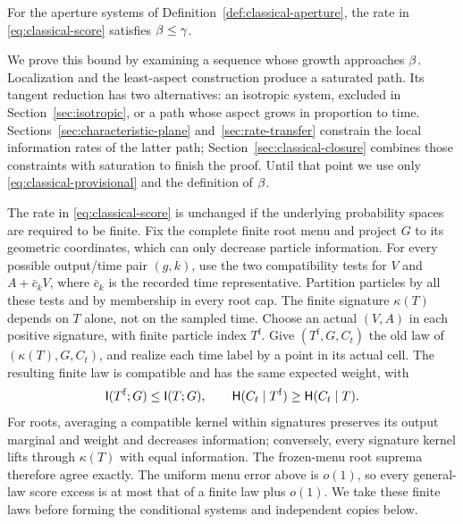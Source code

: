 \begin{theorem}
\label{thm:classical-growth}
For the aperture systems of Definition~\ref{def:classical-aperture},
the rate in \eqref{eq:classical-score} satisfies $\beta\le\gamma$.
\end{theorem}

We prove this bound by examining a sequence whose growth approaches
$\beta$. Localization and the least-aspect construction produce a
saturated path. Its tangent reduction has two alternatives: an isotropic
system, excluded in Section~\ref{sec:isotropic}, or a path whose aspect
grows in proportion to time. Sections~\ref{sec:characteristic-plane}
and~\ref{sec:rate-transfer} constrain the local information rates of
the latter path; Section~\ref{sec:classical-closure} combines those
constraints with saturation to finish the proof. Until that point we
use only \eqref{eq:classical-provisional} and the definition of $\beta$.

The rate in \eqref{eq:classical-score} is unchanged if the underlying
probability spaces are required to be finite.  Fix the complete finite
root menu and project $G$ to its geometric coordinates, which can only
decrease particle information.  For every possible output/time pair $(g,k)$,
use the two compatibility tests for $V$ and $A+\bar c_kV$, where
$\bar c_k$ is the recorded time representative.  Partition particles
by all these tests and by membership in every root cap.  The finite
signature $\kappa(T)$ depends on $T$ alone, not on the sampled time.
Choose an actual $(V,A)$ in each positive signature, with finite
particle index $T^{\mathrm f}$.  Give $(T^{\mathrm f},G,C_t)$ the old
law of $(\kappa(T),G,C_t)$, and realize each time label by a point in
its actual cell.  The resulting finite law is compatible and has the
same expected weight, with
\[
 \mathsf I(T^{\mathrm f};G)\le\mathsf I(T;G),\qquad
 \mathsf H(C_t\mid T^{\mathrm f})\ge\mathsf H(C_t\mid T).
\]
For roots, averaging a compatible kernel within signatures preserves
its output marginal and weight and decreases information; conversely,
every signature kernel lifts through $\kappa(T)$ with equal information.
The frozen-menu root suprema therefore agree exactly.  The uniform menu
error above is $o(1)$, so every general-law score excess is at most that
of a finite law plus $o(1)$.  We take these finite laws before forming
the conditional systems and independent copies below.

